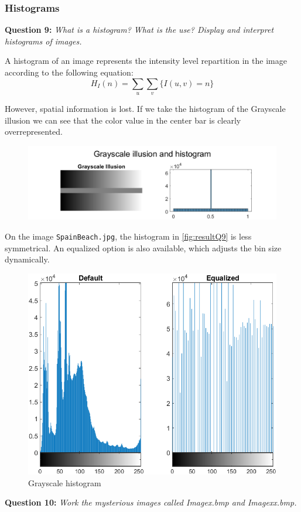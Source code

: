 \subsubsection{Histograms}
\textbf{Question 9:}
\textit{What is a histogram? What is the use? Display and interpret histograms of images.}

A histogram of an image represents the intensity level repartition in the image according to the following equation:
\[H_I(n) = \sum_{u} \sum_{v} \{ I(u, v) = n \}\]

However, spatial information is lost. 
If we take the histogram of the Grayscale illusion we can see that the color value in the center bar is clearly overrepresented.
\begin{figure}[!ht]
    \centering
    \includegraphics[width=0.75\linewidth]{Doc/Graphics/Part1/part1_Q9.png}
\end{figure}

On the image \texttt{SpainBeach.jpg}, the histogram in \autoref{fig:resultQ9} is less symmetrical. An equalized option is also available, which adjusts the bin size dynamically.
\begin{figure}[!ht]
    \centering
    \includegraphics[width=0.5\linewidth]{Doc/Graphics/Part1/Q9_Hist.png}
    \caption{Grayscale histogram}
    \label{fig:resultQ9}
\end{figure}
\FloatBarrier

\textbf{Question 10:}
\textit{Work the mysterious images called Imagex.bmp and Imagexx.bmp.}

